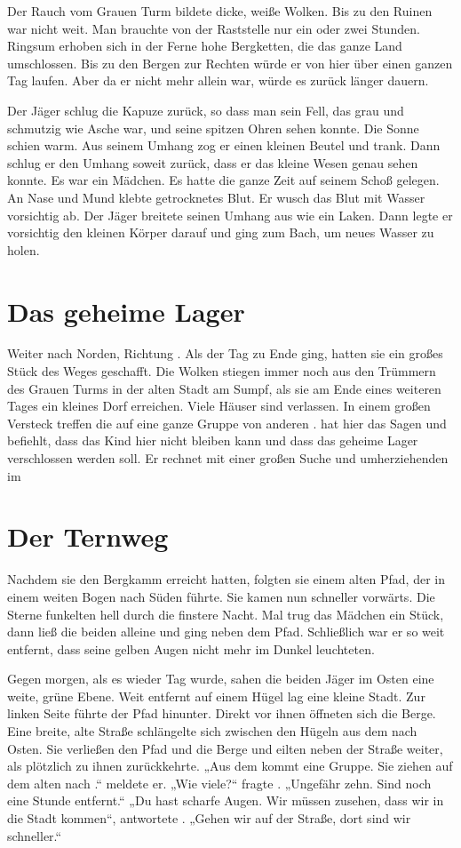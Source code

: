 \begin{huge}
Der Rauch vom Grauen Turm bildete dicke, weiße Wolken. Bis zu den Ruinen war nicht weit. Man brauchte von der Raststelle nur ein oder zwei Stunden. Ringsum erhoben sich in der Ferne hohe Bergketten, die das ganze Land umschlossen. Bis zu den Bergen zur Rechten würde er von hier über einen ganzen Tag laufen. Aber da er nicht mehr allein war, würde es zurück länger dauern.

Der Jäger schlug die Kapuze zurück, so dass man sein Fell, das grau und schmutzig wie Asche war, und seine spitzen Ohren sehen konnte. Die Sonne schien warm. Aus seinem Umhang zog er einen kleinen Beutel und trank. Dann schlug er den Umhang soweit zurück, dass er das kleine Wesen genau sehen konnte. Es war ein Mädchen. Es hatte die ganze Zeit auf seinem Schoß gelegen. An Nase und Mund klebte getrocknetes Blut. Er wusch das Blut mit Wasser vorsichtig ab. Der Jäger breitete seinen Umhang aus wie ein Laken. Dann legte er vorsichtig den kleinen Körper darauf und ging zum Bach, um neues Wasser zu holen.

\section{Das geheime Lager}
Weiter nach Norden, Richtung \Nordmark. Als der Tag zu Ende ging, hatten sie ein großes Stück des Weges geschafft. Die Wolken stiegen immer noch aus den Trümmern des Grauen Turms in der alten Stadt am Sumpf, als sie am Ende eines weiteren Tages ein kleines Dorf erreichen. Viele Häuser sind verlassen. In einem großen Versteck treffen die \Schattenjager auf eine ganze Gruppe von anderen . \Nox hat hier das Sagen und befiehlt, dass das Kind hier nicht bleiben kann und dass das geheime Lager verschlossen werden soll. Er rechnet mit einer großen Suche und umherziehenden \Bangiri im 

\section{Der Ternweg}
Nachdem sie den Bergkamm erreicht hatten, folgten sie einem alten Pfad, der in einem weiten Bogen nach Süden führte. Sie kamen nun schneller vorwärts. Die Sterne funkelten hell durch die finstere Nacht. Mal trug \Eno das Mädchen ein Stück, dann \Bomar  \Dolo ließ die beiden alleine und ging neben dem Pfad. Schließlich war er so weit entfernt, dass seine gelben Augen nicht mehr im Dunkel leuchteten.

Gegen morgen, als es wieder Tag wurde, sahen die beiden Jäger im Osten eine weite, grüne Ebene. Weit entfernt auf einem Hügel lag eine kleine Stadt. Zur linken Seite führte der Pfad hinunter. Direkt vor ihnen öffneten sich die Berge. Eine breite, alte Straße schlängelte sich zwischen den Hügeln aus dem \Enland nach Osten. Sie verließen den Pfad und die Berge und eilten neben der Straße weiter, als \Dolo plötzlich zu ihnen zurückkehrte. „Aus dem \Enland kommt eine Gruppe. Sie ziehen auf dem alten  nach \Lobarn.“ meldete er. „Wie viele?“ fragte \Eno. „Ungefähr zehn. Sind noch eine Stunde entfernt.“ „Du hast scharfe Augen. Wir müssen zusehen, dass wir in die Stadt kommen“, antwortete \Eno. „Gehen wir auf der Straße, dort sind wir schneller.“


\end{huge}
